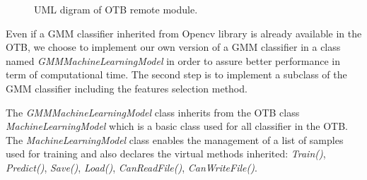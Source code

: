 \documentclass[a4paper,11pt,DIV=16,abstracton]{scrartcl}
\begin{document}
\begin{figure}[!ht]
            \caption{UML digram of OTB remote module.\label{fig:uml}}
        \end{figure}

        Even if a GMM classifier inherited from Opencv library is already available in the OTB, we choose to implement our own version of a GMM classifier in a class named \emph{GMMMachineLearningModel} in order to assure better performance in term of computational time. The second step is to implement a subclass of the GMM classifier including the features selection method.

        The \emph{GMMMachineLearningModel} class inherits from the OTB class \emph{MachineLearningModel} which is a basic class used for all classifier in the OTB. The \emph{MachineLearningModel} class enables the management of a list of samples used for training and also declares the virtual methods inherited: \emph{Train()}, \emph{Predict()}, \emph{Save()}, \emph{Load()}, \emph{CanReadFile()}, \emph{CanWriteFile()}.
\end{document}
